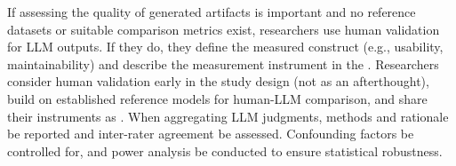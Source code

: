 If assessing the quality of generated artifacts is important and no reference datasets or suitable comparison metrics exist, researchers \should use human validation for LLM outputs. If they do, they \must define the measured construct (e.g., usability, maintainability) and describe the measurement instrument in the \paper. Researchers \should consider human validation early in the study design (not as an afterthought), build on established reference models for human-LLM comparison, and share their instruments as \supplementarymaterial. When aggregating LLM judgments, methods and rationale \should be reported and inter-rater agreement \should be assessed. Confounding factors \should be controlled for, and power analysis \should be conducted to ensure statistical robustness.